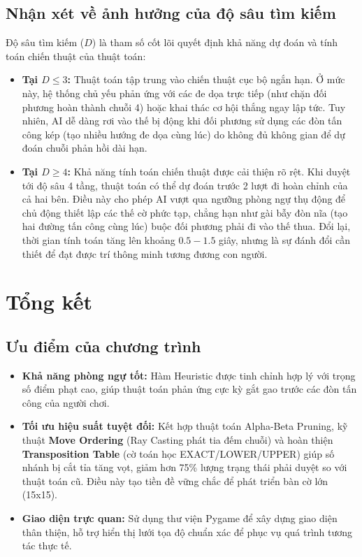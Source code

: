 \documentclass[13pt,a4paper]{article}
\begin{document}
\subsection{Nhận xét về ảnh hưởng của độ sâu tìm kiếm}
Độ sâu tìm kiếm ($D$) là tham số cốt lõi quyết định khả năng dự đoán và tính toán chiến thuật của thuật toán:
\begin{itemize}
    \item \textbf{Tại $D \le 3$:} Thuật toán tập trung vào chiến thuật cục bộ ngắn hạn. Ở mức này, hệ thống chủ yếu phản ứng với các đe dọa trực tiếp (như chặn đối phương hoàn thành chuỗi 4) hoặc khai thác cơ hội thắng ngay lập tức. Tuy nhiên, AI dễ dàng rơi vào thế bị động khi đối phương sử dụng các đòn tấn công kép (tạo nhiều hướng đe dọa cùng lúc) do không đủ không gian để dự đoán chuỗi phản hồi dài hạn.
    \item \textbf{Tại $D \ge 4$:} Khả năng tính toán chiến thuật được cải thiện rõ rệt. Khi duyệt tới độ sâu 4 tầng, thuật toán có thể dự đoán trước 2 lượt đi hoàn chỉnh của cả hai bên. Điều này cho phép AI vượt qua ngưỡng phòng ngự thụ động để chủ động thiết lập các thế cờ phức tạp, chẳng hạn như gài bẫy đòn nĩa (tạo hai đường tấn công cùng lúc) buộc đối phương phải đi vào thế thua. Đổi lại, thời gian tính toán tăng lên khoảng $0.5 - 1.5$ giây, nhưng là sự đánh đổi cần thiết để đạt được trí thông minh tương đương con người.
\end{itemize}

\section{Tổng kết}

\subsection{Ưu điểm của chương trình}
\begin{itemize}
    \item \textbf{Khả năng phòng ngự tốt:} Hàm Heuristic được tinh chỉnh hợp lý với trọng số điểm phạt cao, giúp thuật toán phản ứng cực kỳ gắt gao trước các đòn tấn công của người chơi.
    \item \textbf{Tối ưu hiệu suất tuyệt đối:} Kết hợp thuật toán Alpha-Beta Pruning, kỹ thuật \textbf{Move Ordering} (Ray Casting phát tia đếm chuỗi) và hoàn thiện \textbf{Transposition Table} (cờ toán học EXACT/LOWER/UPPER) giúp số nhánh bị cắt tỉa tăng vọt, giảm hơn 75\% lượng trạng thái phải duyệt so với thuật toán cũ. Điều này tạo tiền đề vững chắc để phát triển bàn cờ lớn (15x15).
    \item \textbf{Giao diện trực quan:} Sử dụng thư viện Pygame để xây dựng giao diện thân thiện, hỗ trợ hiển thị lưới tọa độ chuẩn xác để phục vụ quá trình tương tác thực tế.
\end{itemize}
\end{document}
